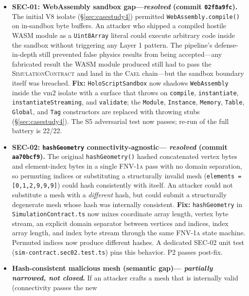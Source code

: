\documentclass[letterpaper,twocolumn,10pt]{article}
\newcommand{\cael}{\textsc{Cael}}
\newcommand{\simcontract}{\textsc{SimulationContract}}
\newcommand{\fnvhash}{\textsc{FNV-1a}}
\begin{document}
\begin{itemize}[leftmargin=*,topsep=2pt,itemsep=2pt]
  \item \textbf{SEC-01: WebAssembly sandbox gap---\emph{resolved}
    (commit \texttt{02f8a9fc}).} The initial V8 isolate
    (\S\ref{sec:casestudy4}) permitted \texttt{WebAssembly.compile()}
    on in-sandbox byte buffers. An attacker who shipped a compiled
    hostile WASM module as a \texttt{Uint8Array} literal could
    execute arbitrary code inside the sandbox without triggering any
    Layer 1 pattern. The pipeline's defense-in-depth still prevented
    false physics results from being accepted---any fabricated result
    the WASM module produced still had to pass the \simcontract{} and
    land in the \cael{} chain---but the sandbox boundary itself was
    breached.
    \textbf{Fix:} \texttt{HoloScriptSandbox} now shadows
    \texttt{WebAssembly} inside the vm2 isolate with a surface that
    throws on \texttt{compile}, \texttt{instantiate},
    \texttt{instantiateStreaming}, and \texttt{validate}; the
    \texttt{Module}, \texttt{Instance}, \texttt{Memory},
    \texttt{Table}, \texttt{Global}, and \texttt{Tag} constructors
    are replaced with throwing stubs (\S\ref{sec:casestudy4}). The
    S5 adversarial test now passes; re-run of the full battery is
    22/22.
  \item \textbf{SEC-02: \texttt{hashGeometry} connectivity-agnostic---%
    \emph{resolved} (commit \texttt{aa70bcf9}).} The original
    \texttt{hashGeometry()} hashed concatenated vertex bytes and
    element-index bytes in a single \fnvhash{} pass with no domain
    separation, so permuting indices or substituting a structurally
    invalid mesh (\texttt{elements = [0,1,2,9,9,9]}) could hash
    consistently with itself. An attacker could not substitute a
    mesh with a \emph{different} hash, but could submit a
    structurally degenerate mesh whose hash was internally consistent.
    \textbf{Fix:} \texttt{hashGeometry} in
    \texttt{SimulationContract.ts} now mixes coordinate array length,
    vertex byte stream, an explicit domain separator between
    vertices and indices, index array length, and index byte stream
    through the same \fnvhash{} state machine. Permuted indices now
    produce different hashes. A dedicated SEC-02 unit test
    (\texttt{sim-contract.sec02.test.ts}) pins this behavior. P2
    passes post-fix.
  \item \textbf{Hash-consistent malicious mesh (semantic gap)---%
    \emph{partially narrowed, not closed}.} If an attacker crafts a
    mesh that is internally valid (connectivity passes the new

\end{itemize}
\end{document}
